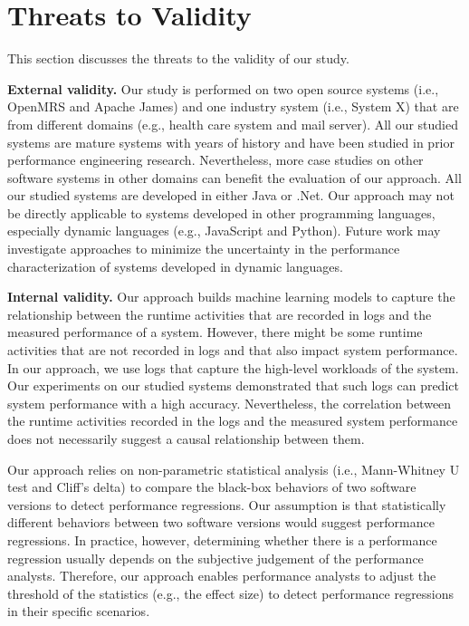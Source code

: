 \section{Threats to Validity} \label{sec:threats}

This section discusses the threats to the validity of our study.

\noindent \textbf{External validity.}
Our study is performed on two open source systems (i.e., OpenMRS and Apache James) and one industry system (i.e., System X) that are from different domains (e.g., health care system and mail server). 
All our studied systems are mature systems with years of history and have been studied in prior performance engineering research. Nevertheless, more case studies on other software systems in other domains can benefit the evaluation of our approach.
All our studied systems are developed in either Java or .Net. Our approach may not be directly applicable to systems developed in other programming languages, especially dynamic languages (e.g., JavaScript and Python). Future work may investigate approaches to minimize the uncertainty in the performance characterization of systems developed in dynamic languages.

\noindent \textbf{Internal validity.}
Our approach builds machine learning models to capture the relationship between the runtime activities that are recorded in logs and the measured performance of a system. 
However, there might be some runtime activities that are not recorded in logs and that also impact system performance.
In our approach, we use logs that capture the high-level workloads of the system. 
Our experiments on our studied systems demonstrated that such logs can predict system performance with a high accuracy.
Nevertheless, the correlation between the runtime activities recorded in the logs and the measured system performance does not necessarily suggest a causal relationship between them.


Our approach relies on non-parametric statistical analysis (i.e., Mann-Whitney U test and Cliff's delta) to compare the black-box behaviors of two software versions to detect performance regressions. 
Our assumption is that statistically different behaviors between two software versions would suggest performance regressions.
In practice, however, determining whether there is a performance regression usually depends on the subjective judgement of the performance analysts.
Therefore, our approach enables performance analysts to adjust the threshold of the statistics (e.g., the effect size) to detect performance regressions in their specific scenarios.

